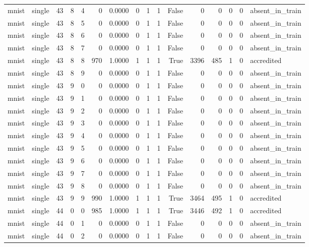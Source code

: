\begin{tabular}{llrrrrrrrrrrrrrl}
mnist & single & 43 & 8 & 4 & 0 & 0.0000 & 0 & 1 & 1 & False & 0 & 0 & 0 & 0 & absent\_in\_train \\
mnist & single & 43 & 8 & 5 & 0 & 0.0000 & 0 & 1 & 1 & False & 0 & 0 & 0 & 0 & absent\_in\_train \\
mnist & single & 43 & 8 & 6 & 0 & 0.0000 & 0 & 1 & 1 & False & 0 & 0 & 0 & 0 & absent\_in\_train \\
mnist & single & 43 & 8 & 7 & 0 & 0.0000 & 0 & 1 & 1 & False & 0 & 0 & 0 & 0 & absent\_in\_train \\
mnist & single & 43 & 8 & 8 & 970 & 1.0000 & 1 & 1 & 1 & True & 3396 & 485 & 1 & 0 & accredited \\
mnist & single & 43 & 8 & 9 & 0 & 0.0000 & 0 & 1 & 1 & False & 0 & 0 & 0 & 0 & absent\_in\_train \\
mnist & single & 43 & 9 & 0 & 0 & 0.0000 & 0 & 1 & 1 & False & 0 & 0 & 0 & 0 & absent\_in\_train \\
mnist & single & 43 & 9 & 1 & 0 & 0.0000 & 0 & 1 & 1 & False & 0 & 0 & 0 & 0 & absent\_in\_train \\
mnist & single & 43 & 9 & 2 & 0 & 0.0000 & 0 & 1 & 1 & False & 0 & 0 & 0 & 0 & absent\_in\_train \\
mnist & single & 43 & 9 & 3 & 0 & 0.0000 & 0 & 1 & 1 & False & 0 & 0 & 0 & 0 & absent\_in\_train \\
mnist & single & 43 & 9 & 4 & 0 & 0.0000 & 0 & 1 & 1 & False & 0 & 0 & 0 & 0 & absent\_in\_train \\
mnist & single & 43 & 9 & 5 & 0 & 0.0000 & 0 & 1 & 1 & False & 0 & 0 & 0 & 0 & absent\_in\_train \\
mnist & single & 43 & 9 & 6 & 0 & 0.0000 & 0 & 1 & 1 & False & 0 & 0 & 0 & 0 & absent\_in\_train \\
mnist & single & 43 & 9 & 7 & 0 & 0.0000 & 0 & 1 & 1 & False & 0 & 0 & 0 & 0 & absent\_in\_train \\
mnist & single & 43 & 9 & 8 & 0 & 0.0000 & 0 & 1 & 1 & False & 0 & 0 & 0 & 0 & absent\_in\_train \\
mnist & single & 43 & 9 & 9 & 990 & 1.0000 & 1 & 1 & 1 & True & 3464 & 495 & 1 & 0 & accredited \\
mnist & single & 44 & 0 & 0 & 985 & 1.0000 & 1 & 1 & 1 & True & 3446 & 492 & 1 & 0 & accredited \\
mnist & single & 44 & 0 & 1 & 0 & 0.0000 & 0 & 1 & 1 & False & 0 & 0 & 0 & 0 & absent\_in\_train \\
mnist & single & 44 & 0 & 2 & 0 & 0.0000 & 0 & 1 & 1 & False & 0 & 0 & 0 & 0 & absent\_in\_train \\

\end{tabular}
